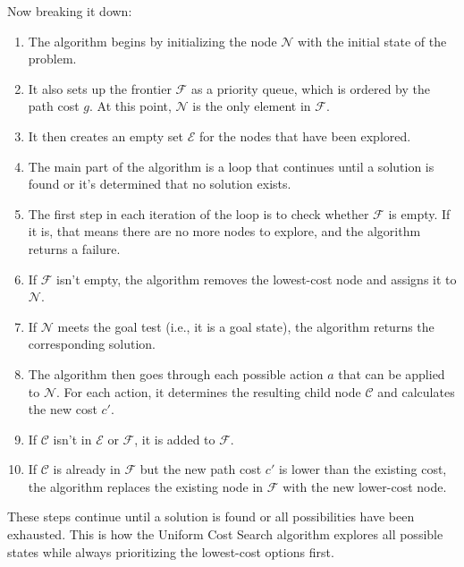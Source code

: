 \documentclass[a4paper,UKenglish,cleveref, autoref, thm-restate]{qlinhta}
\begin{document}
    Now breaking it down:
    \begin{enumerate}
        \item The algorithm begins by initializing the node $\mathcal{N}$ with the initial state of the problem.
        \item It also sets up the frontier $\mathcal{F}$ as a priority queue, which is ordered by the path cost $g$. At this point, $\mathcal{N}$ is the only element in $\mathcal{F}$.
        \item It then creates an empty set $\mathcal{E}$ for the nodes that have been explored.
        \item The main part of the algorithm is a loop that continues until a solution is found or it's determined that no solution exists.
        \item The first step in each iteration of the loop is to check whether $\mathcal{F}$ is empty. If it is, that means there are no more nodes to explore, and the algorithm returns a failure.
        \item If $\mathcal{F}$ isn't empty, the algorithm removes the lowest-cost node and assigns it to $\mathcal{N}$.
        \item If $\mathcal{N}$ meets the goal test (i.e., it is a goal state), the algorithm returns the corresponding solution.
        \item The algorithm then goes through each possible action $a$ that can be applied to $\mathcal{N}$. For each action, it determines the resulting child node $\mathcal{C}$ and calculates the new cost $c'$.
        \item If $\mathcal{C}$ isn't in $\mathcal{E}$ or $\mathcal{F}$, it is added to $\mathcal{F}$.
        \item If $\mathcal{C}$ is already in $\mathcal{F}$ but the new path cost $c'$ is lower than the existing cost, the algorithm replaces the existing node in $\mathcal{F}$ with the new lower-cost node.
    \end{enumerate}
    \vspace{5pt}
    These steps continue until a solution is found or all possibilities have been exhausted. This is how the Uniform Cost Search algorithm explores all possible states while always prioritizing the lowest-cost options first.
\end{document}
